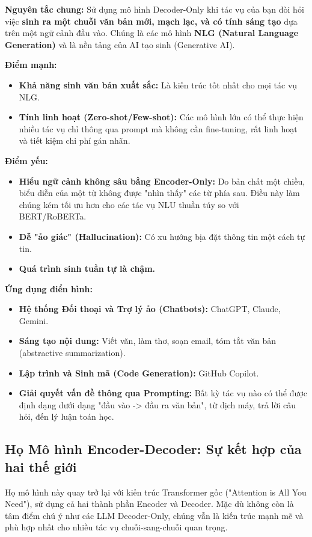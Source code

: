 \begin{tcolorbox}[
    title=Tổng kết: Điểm mạnh và Ứng dụng của Decoder-Only,
    colback=red!5!white, colframe=red!75!black, fonttitle=\bfseries
]
\textbf{Nguyên tắc chung:} Sử dụng mô hình Decoder-Only khi tác vụ của bạn đòi hỏi việc \textbf{sinh ra một chuỗi văn bản mới, mạch lạc, và có tính sáng tạo} dựa trên một ngữ cảnh đầu vào. Chúng là các mô hình \textbf{NLG (Natural Language Generation)} và là nền tảng của AI tạo sinh (Generative AI).

\textbf{Điểm mạnh:}
\begin{itemize}
    \item \textbf{Khả năng sinh văn bản xuất sắc:} Là kiến trúc tốt nhất cho mọi tác vụ NLG.
    \item \textbf{Tính linh hoạt (Zero-shot/Few-shot):} Các mô hình lớn có thể thực hiện nhiều tác vụ chỉ thông qua prompt mà không cần fine-tuning, rất linh hoạt và tiết kiệm chi phí gán nhãn.
\end{itemize}
\textbf{Điểm yếu:}
\begin{itemize}
    \item \textbf{Hiểu ngữ cảnh không sâu bằng Encoder-Only:} Do bản chất một chiều, biểu diễn của một từ không được "nhìn thấy" các từ phía sau. Điều này làm chúng kém tối ưu hơn cho các tác vụ NLU thuần túy so với BERT/RoBERTa.
    \item \textbf{Dễ "ảo giác" (Hallucination):} Có xu hướng bịa đặt thông tin một cách tự tin.
    \item \textbf{Quá trình sinh tuần tự là chậm.}
\end{itemize}

\textbf{Ứng dụng điển hình:}
\begin{itemize}
    \item \textbf{Hệ thống Đối thoại và Trợ lý ảo (Chatbots):} ChatGPT, Claude, Gemini.
    \item \textbf{Sáng tạo nội dung:} Viết văn, làm thơ, soạn email, tóm tắt văn bản (abstractive summarization).
    \item \textbf{Lập trình và Sinh mã (Code Generation):} GitHub Copilot.
    \item \textbf{Giải quyết vấn đề thông qua Prompting:} Bất kỳ tác vụ nào có thể được định dạng dưới dạng "đầu vào -> đầu ra văn bản", từ dịch máy, trả lời câu hỏi, đến lý luận toán học.
\end{itemize}
\end{tcolorbox}


\subsection{Họ Mô hình Encoder-Decoder: Sự kết hợp của hai thế giới}
\label{ssec:encoder_decoder_models}
Họ mô hình này quay trở lại với kiến trúc Transformer gốc ("Attention is All You Need"), sử dụng cả hai thành phần Encoder và Decoder. Mặc dù không còn là tâm điểm chú ý như các LLM Decoder-Only, chúng vẫn là kiến trúc mạnh mẽ và phù hợp nhất cho nhiều tác vụ chuỗi-sang-chuỗi quan trọng.


